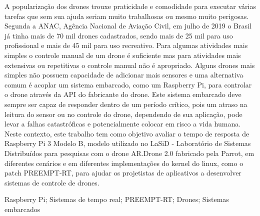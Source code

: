 \resumo
A popularização dos drones trouxe praticidade e comodidade para executar várias tarefas que sem sua ajuda seriam muito trabalhosas ou mesmo muito perigosas. Segunda a ANAC, Agência Nacional de Aviação Civil, em julho de 2019 o Brasil já tinha mais de 70 mil drones cadastrados, sendo mais de 25 mil para uso profissional e mais de 45 mil para uso recreativo. Para algumas atividades mais simples o controle manual de um drone é suficiente mas para atividades mais extensivas ou repetitivas o controle manual não é apropriado. Alguns drones mais simples não possuem capacidade de adicionar mais sensores e uma alternativa comum é acoplar um sistema embarcado, como um Raspberry Pi, para controlar o drone através da API do fabricante do drone. Este sistema embarcado deve sempre ser capaz de responder dentro de um período crítico, pois um atraso na leitura do sensor ou no controle do drone, dependendo de sua aplicação, pode levar a falhas catastróficas e potencialmente colocar em risco a vida humana. Neste contexto, este trabalho tem como objetivo avaliar o tempo de resposta de Raspberry Pi 3 Modelo B, modelo utilizado no LaSiD - Laboratório de Sistemas Distribuídos para pesquisas com o drone AR.Drone 2.0 fabricado pela Parrot, em diferentes cenários e em diferentes implementações do kernel do linux, como o patch PREEMPT-RT, para ajudar os projetistas de aplicativos a desenvolver sistemas de controle de drones.

\begin{keywords}
Raspberry Pi; Sistemas de tempo real; PREEMPT-RT; Drones; Sistemas embarcados
\end{keywords}
